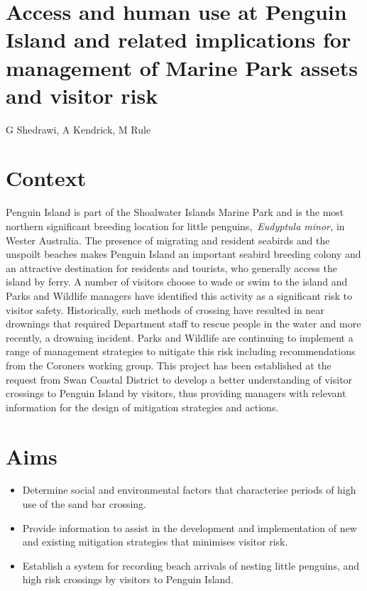 \documentclass[version=last,
    paper=a4, %
    10pt, %
    usenames,
    dvipsnames,
    oneside, %
    headings=openany, %
    DIV=15 %
]{scrbook}
\begin{document}
\section*{Access and human use at Penguin Island and related implications for
management of Marine Park assets and visitor risk
}

G Shedrawi, A Kendrick, M Rule


\section*{Context}
Penguin Island is part of the Shoalwater Islands Marine Park and is the
most northern significant breeding location for little
penguins,~\emph{Eudyptula minor,} in Wester Australia. The presence of
migrating and resident seabirds and the unspoilt beaches makes Penguin
Island an important seabird breeding colony and an attractive
destination for residents and tourists, who generally access the island
by ferry. A number of visitors choose to wade or swim to the island and
Parks and Wildlife managers have identified this activity as a
significant risk to visitor safety. Historically, such methods of
crossing have resulted in near drownings that required Department staff
to rescue people in the water and more recently, a drowning incident.
Parks and Wildlife are continuing to implement a range of management
strategies to mitigate this risk including recommendations from the
Coroners working group. This project has been established at the request
from Swan Coastal District to develop a better understanding of visitor
crossings to Penguin Island by visitors, thus providing managers with
relevant information for the design of mitigation strategies and
actions.~



\section*{Aims}
\begin{itemize}
\itemsep1pt\parskip0pt
\item
  Determine social and environmental factors that characterise periods
  of high use of the sand bar crossing.
\item
  Provide information to assist in the development and implementation of
  new and existing mitigation strategies that minimises visitor risk.
\item
  Establish a system for recording beach arrivals of nesting little
  penguins, and high risk crossings by visitors to Penguin Island.
\end{itemize}
\end{document}
